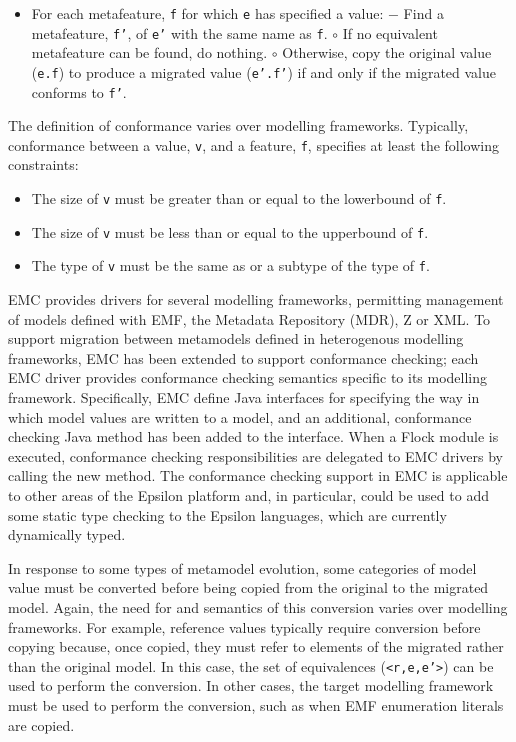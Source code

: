 \begin{itemize}
	\item For each metafeature, \texttt{f} for which \texttt{e} has specified a value:
		\subitem $-$ Find a metafeature, \texttt{f'}, of \texttt{e'} with the same name as \texttt{f}.
			\subsubitem $\circ$ If no equivalent metafeature can be found, do nothing.
			\subsubitem $\circ$ Otherwise, copy the original value (\texttt{e.f}) to produce a migrated value (\texttt{e'.f'}) if and only if the migrated value conforms to \texttt{f'}.
\end{itemize}

The definition of conformance varies over modelling frameworks. Typically, conformance between a value, \texttt{v}, and a feature, \texttt{f}, specifies at least the following constraints:

\begin{itemize}
	\item The size of \texttt{v} must be greater than or equal to the lowerbound of \texttt{f}.
	\item The size of \texttt{v} must be less than or equal to the upperbound of \texttt{f}.
	\item The type of \texttt{v} must be the same as or a subtype of the type of \texttt{f}.
\end{itemize}

EMC provides drivers for several modelling frameworks, permitting management of models defined with EMF, the Metadata Repository (MDR), Z or XML. To support migration between metamodels defined in heterogenous modelling frameworks, EMC has been extended to support conformance checking; each EMC driver provides conformance checking semantics specific to its modelling framework. Specifically, EMC define Java interfaces for specifying the way in which model values are written to a model, and an additional, conformance checking Java method has been added to the interface. When a Flock module is executed, conformance checking responsibilities are delegated to EMC drivers by calling the new method. The conformance checking support in EMC is applicable to other areas of the Epsilon platform and, in particular, could be used to add some static type checking to the Epsilon languages, which are currently dynamically typed.

In response to some types of metamodel evolution, some categories of model value must be converted before being copied from the original to the migrated model. Again, the need for and semantics of this conversion varies over modelling frameworks. For example, reference values typically require conversion before copying because, once copied, they must refer to elements of the migrated rather than the original model. In this case, the set of equivalences (\texttt{<r,e,e'>}) can be used to perform the conversion. In other cases, the target modelling framework must be used to perform the conversion, such as when EMF enumeration literals are copied.

